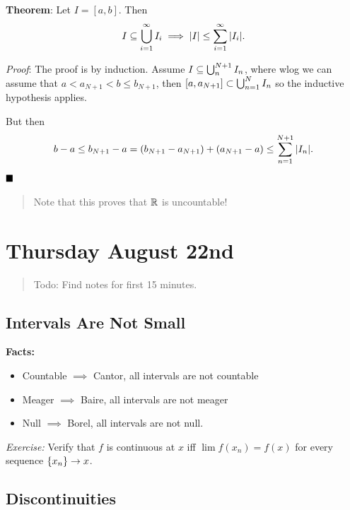 \textbf{Theorem}: Let \(I = [a,b]\). Then
\begin{align*}
I \subseteq \bigcup_{i=1}^\infty I_i \implies {\left\lvert {I} \right\rvert} \leq \sum_{i=1}^\infty {\left\lvert {I_i} \right\rvert}
.\end{align*}

\emph{Proof}: The proof is by induction. Assume
\(I \subseteq \bigcup_n^{N+1} I_n\), where wlog we can assume that
\(a < a_{N+1} < b \leq b_{N+1}\), then
\([a, a_{N+1}] \subset \bigcup_{n=1}^N I_n\) so the inductive hypothesis
applies.

But then
\begin{align*}
b-a \leq b_{N+1} - a = (b_{N+1} - a_{N+1}) + (a_{N+1} - a) \leq \sum_{n=1}^{N+1} {\left\lvert {I_n} \right\rvert}
.\end{align*} \(\qed\)

\begin{quote}
Note that this proves that \({\mathbb{R}}\) is uncountable!
\end{quote}

\hypertarget{thursday-august-22nd}{%
\section{Thursday August 22nd}\label{thursday-august-22nd}}

\begin{quote}
Todo: Find notes for first 15 minutes.
\end{quote}

\hypertarget{intervals-are-not-small}{%
\subsection{Intervals Are Not Small}\label{intervals-are-not-small}}

\textbf{Facts:}

\begin{itemize}
\item
  Countable \(\implies\) Cantor, all intervals are not countable
\item
  Meager \(\implies\) Baire, all intervals are not meager
\item
  Null \(\implies\) Borel, all intervals are not null.
\end{itemize}

\emph{Exercise:} Verify that \(f\) is continuous at \(x\) iff
\(\lim f(x_{n}) = f(x)\) for every sequence \(\left\{{x_{n}}\right\} \to x\).

\hypertarget{discontinuities}{%
\subsection{Discontinuities}\label{discontinuities}}

